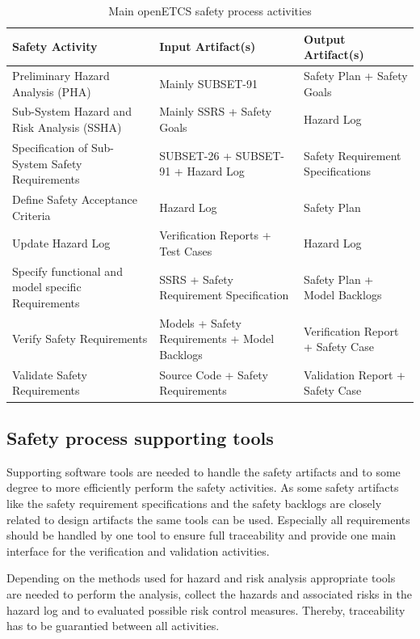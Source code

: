 \documentclass{template/openetcs_article}
\begin{document}
\begin{table}[htbp]
  \centering
  \caption{Main openETCS safety process activities}
    \begin{tabular}{p{6cm}|p{4cm}|p{4cm}} 
 \textbf{Safety Activity} & \textbf{Input Artifact(s)} & \textbf{Output Artifact(s)}  \\ \hline
 Preliminary Hazard Analysis (PHA) & Mainly SUBSET-91 & Safety Plan + Safety Goals \\ 
 Sub-System Hazard and Risk Analysis (SSHA) & Mainly SSRS + Safety Goals & Hazard Log \\ 
 Specification of Sub-System Safety Requirements & SUBSET-26 + SUBSET-91 + Hazard Log  & Safety Requirement Specifications \\ 
 Define Safety Acceptance Criteria & Hazard Log & Safety Plan  \\ 
 Update Hazard Log & Verification Reports + Test Cases & Hazard Log \\
 Specify functional and model specific Requirements & SSRS + Safety Requirement Specification & Safety Plan + Model Backlogs\\
 Verify Safety Requirements & Models + Safety Requirements + Model Backlogs & Verification Report + Safety Case \\
 Validate Safety Requirements & Source Code + Safety Requirements & Validation Report + Safety Case \\
 
\end{tabular}  
  \label{tab:openETCS-Safety-activities}%
\end{table}%

\subsection{Safety process supporting tools}

Supporting software tools are needed to handle the safety artifacts and to some degree to more efficiently perform the safety activities. As some safety artifacts like the safety requirement specifications and the safety backlogs are closely related to design artifacts the same tools can be used. Especially all requirements should be handled by one tool to ensure full traceability and provide one main interface for the verification and validation activities.

Depending on the methods used for hazard and risk analysis appropriate tools are needed to perform the analysis, collect the hazards and associated risks in the hazard log and to evaluated possible risk control measures. Thereby, traceability has to be guarantied between all activities.
\end{document}
